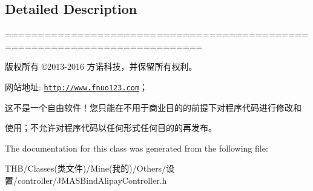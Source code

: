\subsection{Detailed Description}
============================================================================

版权所有 ©2013-\/2016 方诺科技，并保留所有权利。

网站地址\+: \href{http://www.fnuo123.com}{\tt http\+://www.\+fnuo123.\+com}； 



这不是一个自由软件！您只能在不用于商业目的的前提下对程序代码进行修改和

使用；不允许对程序代码以任何形式任何目的的再发布。 

 

The documentation for this class was generated from the following file\+:\begin{DoxyCompactItemize}
\item 
T\+H\+B/\+Classes(类文件)/\+Mine(我的)/\+Others/设置/controller/J\+M\+A\+S\+Bind\+Alipay\+Controller.\+h\end{DoxyCompactItemize}
